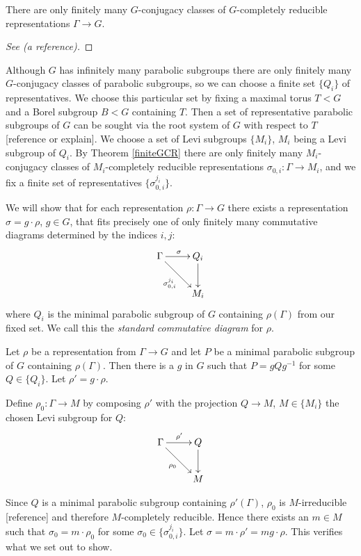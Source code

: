 \begin{theorem} \label{finiteGCR} There are only finitely many $G$-conjugacy classes of $G$-completely reducible representations $\Gamma\rightarrow G$.\qedhere
\end{theorem}
\begin{proof}[See (a reference)]
\end{proof}

Although $G$ has infinitely many parabolic subgroups there are only finitely many $G$-conjugacy classes of parabolic subgroups, so we can choose a finite set $\{Q_i\}$ of representatives. We choose this particular set by fixing a maximal torus $T<G$ and a Borel subgroup $B<G$ containing $T$. Then a set of representative parabolic subgroups of $G$ can be sought via the root system of $G$ with respect to $T$ [reference or explain]. We choose a set of Levi subgroups $\{M_i\}$, $M_i$ being a Levi subgroup of $Q_i$. By Theorem \ref{finiteGCR} there are only finitely many $M_i$-conjugacy classes of $M_i$-completely reducible representations $\sigma_{0, i}:\Gamma\rightarrow M_i$, and we fix a finite set of representatives $\{\sigma^{j_i}_{0,i}\}$.

We will show that for each representation $\rho:\Gamma\rightarrow G$ there exists a representation $\sigma = g\cdot\rho$, $g\in G$, that fits precisely one of only finitely many commutative diagrams determined by the indices $i,j$:
\begin{displaymath}
	\xymatrix{
	\Gamma \ar[r]^{\sigma} \ar[rd]_{\sigma^{j_i}_{0,i}} & Q_i \ar[d]\\
	& M_i}
\end{displaymath}
where $Q_i$ is the minimal parabolic subgroup of $G$ containing $\rho(\Gamma)$ from our fixed set. We call this the \emph{standard commutative diagram} for $\rho$.

Let $\rho$ be a representation from $\Gamma\rightarrow G$ and let $P$ be a minimal parabolic subgroup of $G$ containing $\rho(\Gamma)$. Then there is a $g$ in $G$ such that $P = gQg^{-1}$ for some $Q\in\{Q_i\}$. Let $\rho' = g\cdot \rho$. 

Define $\rho_0:\Gamma\rightarrow M$ by composing $\rho'$ with the projection $Q\rightarrow M$, $M\in\{M_i\}$ the chosen Levi subgroup for $Q$:
\begin{displaymath}
	\xymatrix{
	\Gamma \ar[r]^{\rho'} \ar[rd]_{\rho_0} & Q \ar[d]\\
	& M}
\end{displaymath}

Since $Q$ is a minimal parabolic subgroup containing $\rho'(\Gamma)$, $\rho_0$ is $M$-irreducible [reference] and therefore $M$-completely reducible. Hence there exists an $m\in M$ such that $\sigma_0 = m\cdot \rho_0$ for some $\sigma_0\in\{\sigma^{j_i}_{0,i}\}$. Let $\sigma = m\cdot \rho' = mg\cdot \rho$. This verifies what we set out to show.

